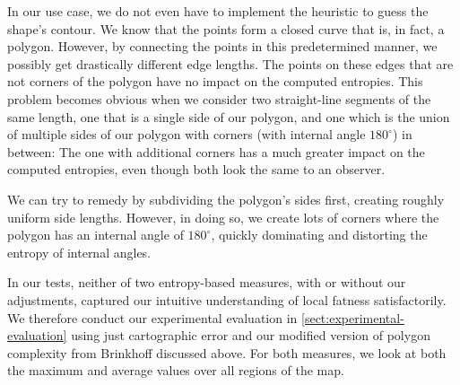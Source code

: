 In our use case, we do not even have to implement the heuristic to guess the shape's contour.
We know that the points form a closed curve that is, in fact, a polygon.
However, by connecting the points in this predetermined manner, we possibly get drastically different edge lengths.
The points on these edges that are not corners of the polygon have no impact on the computed entropies.
This problem becomes obvious when we consider two straight-line segments of the same length, one that is a single side of our polygon, and one which is the union of multiple sides of our polygon with corners (with internal angle $180^\circ$) in between:
The one with additional corners has a much greater impact on the computed entropies, even though both look the same to an observer.

We can try to remedy by subdividing the polygon's sides first, creating roughly uniform side lengths.
However, in doing so, we create lots of corners where the polygon has an internal angle of $180^\circ$, quickly dominating and distorting the entropy of internal angles.

In our tests, neither of two entropy-based measures, with or without our adjustments, captured our intuitive understanding of local fatness satisfactorily.
We therefore conduct our experimental evaluation in \cref{sect:experimental-evaluation} using just cartographic error and our modified version of polygon complexity from Brinkhoff \etal{} \cite{brinkhoff1995measuring} discussed above.
For both measures, we look at both the maximum and average values over all regions of the map.
